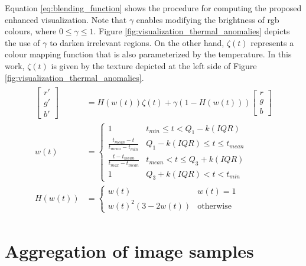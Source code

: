 Equation \ref{eq:blending_function} shows the procedure for computing the proposed enhanced visualization. Note that $\gamma$ enables modifying the brightness of \acrshort{rgb} colours, where $0 \leq \gamma \leq 1$. Figure \ref{fig:visualization_thermal_anomalies} depicts the use of $\gamma$ to darken irrelevant regions. On the other hand, $\zeta(t)$ represents a colour mapping function that is also parameterized by the temperature. In this work, $\zeta(t)$ is given by the texture depicted at the left side of Figure \ref{fig:visualization_thermal_anomalies}.
\begin{gather}
    \label{eq:blending_function}
    \begin{aligned}
        \begin{bmatrix}
            r'\\g'\\b'
        \end{bmatrix} &=
        H(w(t))\zeta(t) + \gamma(1 - H(w(t)))\begin{bmatrix}
            r\\g\\b
        \end{bmatrix}\\
        w(t) &=
        \begin{cases}
            1 &t_{\textit{min}} \leq t < Q_1 - k(\textit{IQR})\\
            \frac{t_{\textit{mean}} - t}{t_{\textit{mean}} - t_{\textit{min}}} &Q_1 - k(\textit{IQR}) \leq t \leq t_{\textit{mean}}\\
            \frac{t - t_{\textit{mean}}}{t_{\textit{max}} - t_{\textit{mean}}} &t_{\textit{mean}} < t \leq Q_3 + k(\textit{IQR})\\
            1 &Q_3 + k(\textit{IQR}) < t < t_{\textit{min}}
        \end{cases}\\
        H(w(t)) &=
        \begin{cases}
            w(t) &w(t) = 1\\
            w(t)^2(3 - 2w(t)) &\text{otherwise}
        \end{cases}
    \end{aligned}
\end{gather}

\section{Aggregation of image samples}

